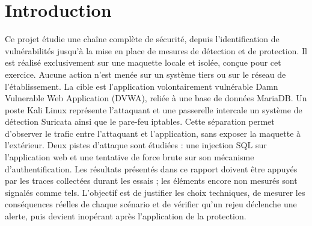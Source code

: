 \section{Introduction}\label{sec:introduction}

Ce projet étudie une chaîne complète de sécurité, depuis l'identification de vulnérabilités jusqu'à la mise en place de mesures de détection et de protection.
Il est réalisé exclusivement sur une maquette locale et isolée, conçue pour cet exercice.
Aucune action n'est menée sur un système tiers ou sur le réseau de l'établissement.
La cible est l'application volontairement vulnérable Damn Vulnerable Web Application (DVWA), reliée à une base de données MariaDB\@.
Un poste Kali Linux représente l'attaquant et une passerelle intercale un système de détection Suricata ainsi que le pare-feu iptables.
Cette séparation permet d'observer le trafic entre l'attaquant et l'application, sans exposer la maquette à l'extérieur.
Deux pistes d'attaque sont étudiées : une injection SQL sur l'application web et une tentative de force brute sur son mécanisme d'authentification.
Les résultats présentés dans ce rapport doivent être appuyés par les traces collectées durant les essais ; les éléments encore non mesurés sont signalés comme tels.
L'objectif est de justifier les choix techniques, de mesurer les conséquences réelles de chaque scénario et de vérifier qu'un rejeu déclenche une alerte, puis devient inopérant après l'application de la protection.
